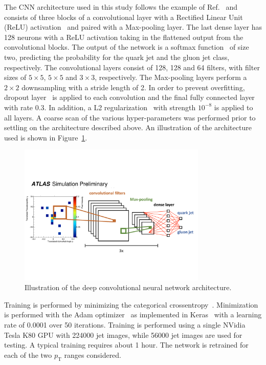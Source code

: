 The CNN architecture used in this study follows the example of Ref.~\cite{Komiske:2016rsd} and consists of three blocks of a convolutional layer with a
Rectified Linear Unit (ReLU) activation~\cite{RELU} and paired with a Max-pooling layer.
The last dense layer has 128 neurons with a ReLU activation taking in the flattened output from the convolutional blocks.
The output of the network is a softmax function~\cite{Goodfellow-et-al-2016-Book} of size two, 
predicting the probability for the quark jet and the gluon jet class, respectively. 
The convolutional layers consist of 128, 128 and 64 filters, with filter sizes of $5\times5$, $5\times5$ and $3\times3$, respectively.
The Max-pooling layers perform a $2\times2$ downsampling with a stride length of 2.
In order to prevent overfitting, dropout layer~\cite{Goodfellow-et-al-2016-Book} is applied to each convolution and the final fully connected layer with rate 0.3.
In addition, a L2 regularization~\cite{Goodfellow-et-al-2016-Book} with strength $10^{-8}$ is applied to all layers.  
A coarse scan of the various hyper-parameters was performed prior to settling on the architecture described above.
An illustration of the architecture used is shown in Figure~\ref{fig:networkarch}.

\begin{figure}[htpb]
\begin{center}
\includegraphics[width=0.8\textwidth]{figures/CNN/network.pdf}
\caption{Illustration of the deep convolutional neural network architecture.}
\label{fig:networkarch}
\end{center}
\end{figure}

Training is performed by minimizing the categorical crossentropy~\cite{Goodfellow-et-al-2016-Book}.
Minimization is performed with the Adam optimizer~\cite{DBLP:journals/corr/KingmaB14} 
as implemented in Keras~\cite{chollet2015keras} 
with a learning rate of 0.0001 over 50 iterations.
Training is performed using a single NVidia Tesla K80 GPU with 224000 jet images, while 56000 jet images are used for testing.
A typical training requires about 1 hour.
The network is retrained for each of the two $p_\text{T}$ ranges considered.

